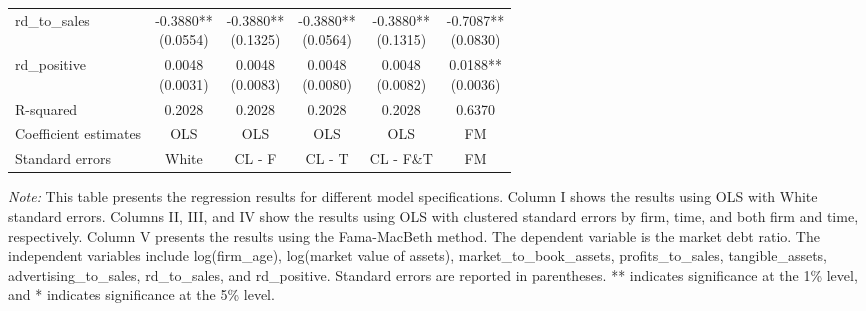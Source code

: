 \documentclass{article}
\begin{document}
\begin{longtable}{@{\extracolsep{\fill}}lccccc}
    rd\_to\_sales                 &
    \makecell{-0.3880**                                                           \\(0.0554)} &
    \makecell{-0.3880**                                                           \\(0.1325)} &
    \makecell{-0.3880**                                                           \\(0.0564)} &
    \makecell{-0.3880**                                                           \\(0.1315)} &
    \makecell{-0.7087**                                                           \\(0.0830)} \\
    rd\_positive                  &
    \makecell{0.0048                                                              \\(0.0031)} &
    \makecell{0.0048                                                              \\(0.0083)} &
    \makecell{0.0048                                                              \\(0.0080)} &
    \makecell{0.0048                                                              \\(0.0082)} &
    \makecell{0.0188**                                                            \\(0.0036)} \\
    R-squared                     & 0.2028 & 0.2028 & 0.2028 & 0.2028    & 0.6370 \\
    Coefficient estimates         & OLS    & OLS    & OLS    & OLS       & FM     \\
    Standard errors               & White  & CL - F & CL - T & CL - F\&T & FM     \\
\end{longtable}
{\parbox{\textwidth}{
    \footnotesize
    \textit{Note:} This table presents the regression results for different model specifications.
    Column I shows the results using OLS with White standard errors.
    Columns II, III, and IV show the results using OLS with clustered standard errors by firm, time, and both firm and time, respectively.
    Column V presents the results using the Fama-MacBeth method.
    The dependent variable is the market debt ratio.
    The independent variables include log(firm\_age), log(market value of assets), market\_to\_book\_assets, profits\_to\_sales, tangible\_assets, advertising\_to\_sales, rd\_to\_sales, and rd\_positive.
    Standard errors are reported in parentheses.
    ** indicates significance at the 1\% level, and * indicates significance at the 5\% level.
}}
\end{document}
